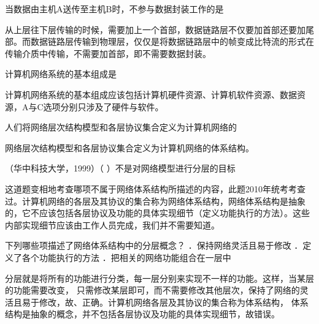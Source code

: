 \question 当数据由主机A送传至主机B时，不参与数据封装工作的是
\par{}
\begin{solution}从上层往下层传输的时候，需要加上一个首部，数据链路层不仅要加首部还要加尾部。而数据链路层传输到物理层，仅仅是将数据链路层中的帧变成比特流的形式在传输介质中传输，不需要加首部，即不需要数据封装。
\end{solution}
\question 计算机网络系统的基本组成是
\par{}
\begin{solution}计算机网络系统的基本组成应该包括计算机硬件资源、计算机软件资源、数据资源，A与C选项分别只涉及了硬件与软件。
\end{solution}
\question 人们将网络层次结构模型和各层协议集合定义为计算机网络的
\par{}
\begin{solution}网络层次结构模型和各层协议集合定义为计算机网络的体系结构。
\end{solution}
\question （华中科技大学，1999）（ ）不是对网络模型进行分层的目标
\par{}
\begin{solution}这道题变相地考查哪项不属于网络体系结构所描述的内容，此题2010年统考考查过。计算机网络的各层及其协议的集合称为网络体系结构，网络体系结构是抽象的，它不应该包括各层协议及功能的具体实现细节（定义功能执行的方法）。这些内部实现细节应该由工作人员完成，我们并不需要知道。
\end{solution}
\question 下列哪些项描述了网络体系结构中的分层概念？ ．保持网络灵活且易于修改
．定义了各个功能执行的方法 ．把相关的网络功能组合在一层中
\par{}
\begin{solution}分层就是将所有的功能进行分类，每一层分别来实现不一样的功能。这样，当某层的功能需要改变，
    只需修改某层即可，而不需要修改其他层次，保持了网络的灵活且易于修改，故、正确。计算机网络各层及其协议的集合称为体系结构，
    体系结构是抽象的概念，并不包括各层协议及功能的具体实现细节，故错误。
\end{solution}
